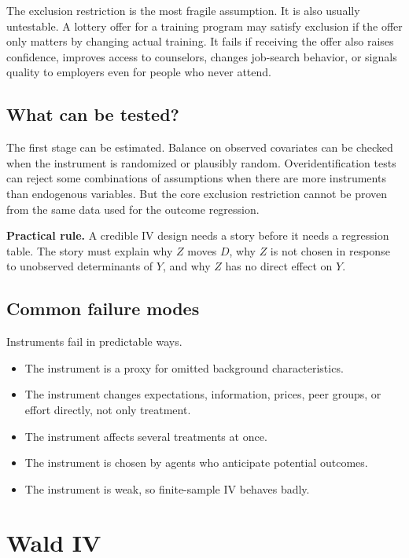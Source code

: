 The exclusion restriction is the most fragile assumption. It is also usually
untestable. A lottery offer for a training program may satisfy exclusion if the
offer only matters by changing actual training. It fails if receiving the offer
also raises confidence, improves access to counselors, changes job-search
behavior, or signals quality to employers even for people who never attend.

\subsection{What can be tested?}

The first stage can be estimated. Balance on observed covariates can be checked
when the instrument is randomized or plausibly random. Overidentification tests
can reject some combinations of assumptions when there are more instruments than
endogenous variables. But the core exclusion restriction cannot be proven from
the same data used for the outcome regression.

\begin{boxD}
\textbf{Practical rule.} A credible IV design needs a story before it needs a
regression table. The story must explain why $Z$ moves $D$, why $Z$ is not
chosen in response to unobserved determinants of $Y$, and why $Z$ has no direct
effect on $Y$.
\end{boxD}

\subsection{Common failure modes}

Instruments fail in predictable ways.
\begin{itemize}
  \item The instrument is a proxy for omitted background characteristics.
  \item The instrument changes expectations, information, prices, peer groups,
        or effort directly, not only treatment.
  \item The instrument affects several treatments at once.
  \item The instrument is chosen by agents who anticipate potential outcomes.
  \item The instrument is weak, so finite-sample IV behaves badly.
\end{itemize}

\section{Wald IV}

